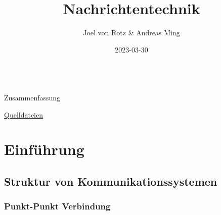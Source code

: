 \documentclass[
  10pt,
  a4paper,
  german]{article}
\title{Nachrichtentechnik}
\author{Joel von Rotz \& Andreas Ming}
\date{2023-03-30}
\numberwithin{equation}{section}
\renewcommand*\contentsname{Inhaltsverzeichnis}
\newcommand\contentsname{Inhaltsverzeichnis}
\begin{document}

\makeatletter
\begin{center}
  \vspace*{0.5cm}
  
  \textbf{\Huge \@title} \\
  \vspace{0.1cm}
  \textsf{\normalsize Zusammenfassung}
  
  \vspace{0.1cm}

  {\Large {\@author}}
  
  \vspace{0.5cm}

\end{center}
\makeatother

\begin{center}
{\large \faGithub\space \href{https://github.com/joelvonrotz/bachelor-electrical-engineering/tree/main/semester\%204/summary/nachrichtentechnik}{Quelldateien}}
\end{center}




\ifdefined\Shaded\renewenvironment{Shaded}{\begin{tcolorbox}[colback={shadecolor}, boxrule=0pt, frame hidden, enhanced, breakable]}{\end{tcolorbox}}\fi\ifdefined\Shaded\renewenvironment{Shaded}{\begin{tcolorbox}[boxrule=0pt, breakable, frame hidden, sharp corners, colback={codebgcolor}, borderline west={3pt}{0pt}{shadecolor}, enhanced]}{\end{tcolorbox}}\fi

\renewcommand*\contentsname{Inhaltsverzeichnis}
{
\hypersetup{linkcolor=}
\setcounter{tocdepth}{3}
\tableofcontents
}
\hypertarget{einfuxfchrung}{%
\section{Einführung}\label{einfuxfchrung}}

\hypertarget{struktur-von-kommunikationssystemen}{%
\subsection{Struktur von
Kommunikationssystemen}\label{struktur-von-kommunikationssystemen}}

\hypertarget{punkt-punkt-verbindung}{%
\subsubsection{Punkt-Punkt Verbindung}\label{punkt-punkt-verbindung}}
\end{document}
